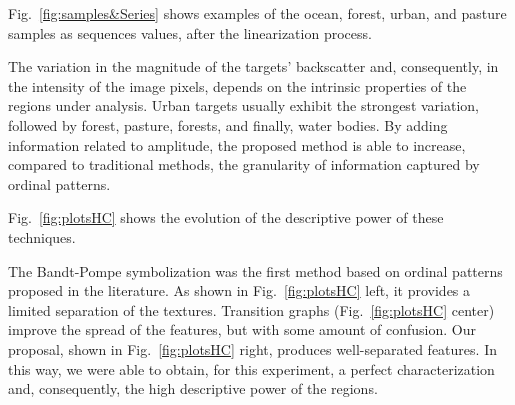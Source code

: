 \documentclass[journal]{IEEEtran}
\begin{document}
	Fig.~\ref{fig:samples&Series} shows examples of the ocean, forest, urban, and pasture samples as sequences values, after the linearization process.
	
	The variation in the magnitude of the targets' backscatter and, consequently, in the intensity of the image pixels, depends on the intrinsic properties of the regions under analysis.
	Urban targets usually exhibit the strongest variation, followed by forest, pasture, forests, and finally, water bodies.
	By adding information related to amplitude, the proposed method is able to increase, compared to traditional methods, the granularity of information captured by ordinal patterns.
	
	Fig.~\ref{fig:plotsHC} shows the evolution of the descriptive power of these techniques.
	
	The Bandt-Pompe symbolization was the first method based on ordinal patterns proposed in the literature.
	As shown in Fig.~\ref{fig:plotsHC} left, it provides a limited separation of the textures.
	Transition graphs (Fig.~\ref{fig:plotsHC} center) improve the spread of the features, but with some amount of confusion.
	Our proposal, shown in Fig.~\ref{fig:plotsHC} right, produces well-separated features.
	In this way, we were able to obtain, for this experiment, a perfect characterization and, consequently, the high descriptive power of the regions.
	
\end{document}
